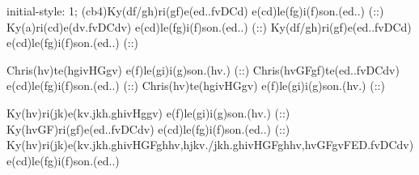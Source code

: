 initial-style: 1;
(cb4)Ky(df/gh)ri(gf)e(ed..fvDCd) e(cd)le(fg)i(f)son.(ed..) (::) Ky(a)ri(cd)e(dv.fvDCdv) e(cd)le(fg)i(f)son.(ed..) (::) Ky(df/gh)ri(gf)e(ed..fvDCd) e(cd)le(fg)i(f)son.(ed..) (::)

Chris(hv)te(hgivHGgv) e(f)le(gi)i(g)son.(hv.) (::) Chris(hvGFgf)te(ed..fvDCdv) e(cd)le(fg)i(f)son.(ed..) (::) Chris(hv)te(hgivHGgv) e(f)le(gi)i(g)son.(hv.) (::)

Ky(hv)ri(jk)e(kv.jkh.ghivHggv) e(f)le(gi)i(g)son.(hv.) (::) Ky(hvGF)ri(gf)e(ed..fvDCdv) e(cd)le(fg)i(f)son.(ed..) (::) Ky(hv)ri(jk)e(kv.jkh.ghivHGFghhv,hjkv./jkh.ghivHGFghhv,hvGFgvFED.fvDCdv) e(cd)le(fg)i(f)son.(ed..)
